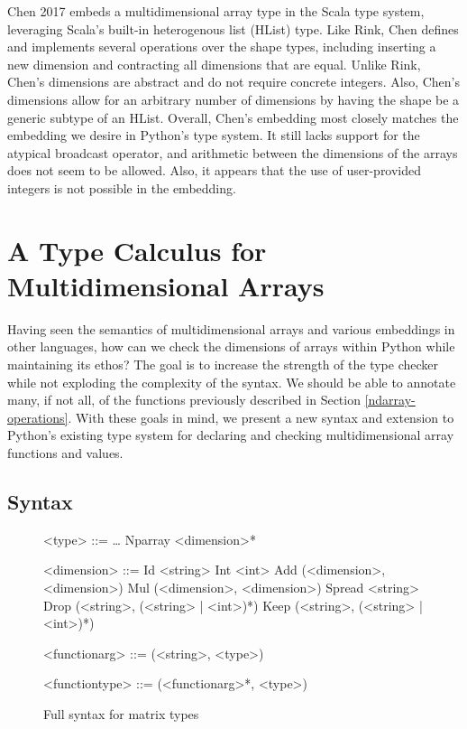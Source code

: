 \documentclass{report}
\begin{document}
Chen 2017 embeds a multidimensional array type in the Scala type system, leveraging Scala's built-in heterogenous list (HList) type. Like Rink, Chen defines and implements several operations over the shape types, including inserting a new dimension and contracting all dimensions that are equal. Unlike Rink, Chen's dimensions are abstract and do not require concrete integers. Also, Chen's dimensions allow for an arbitrary number of dimensions by having the shape be a generic subtype of an HList. Overall, Chen's embedding most closely matches the embedding we desire in Python's type system. It still lacks support for the atypical broadcast operator, and arithmetic between the dimensions of the arrays does not seem to be allowed. Also, it appears that the use of user-provided integers is not possible in the embedding.

\chapter{A Type Calculus for Multidimensional Arrays}

Having seen the semantics of multidimensional arrays and various embeddings in other languages, how can we check the dimensions of arrays within Python while maintaining its ethos? The goal is to increase the strength of the type checker while not exploding the complexity of the syntax. We should be able to annotate many, if not all, of the functions previously described in Section \ref{ndarray-operations}. With these goals in mind, we present a new syntax and extension to Python's existing type system for declaring and checking multidimensional array functions and values.

\section{Syntax}

\begin{figure}
    \centering
    \begin{grammar}
        <type> ::= \ldots
        \alt Nparray <dimension>*

        <dimension> ::= Id <string>
        \alt Int <int>
        \alt Add (<dimension>, <dimension>)
        \alt Mul (<dimension>, <dimension>)
        \alt Spread <string>
        \alt Drop (<string>, (<string> | <int>)*)
        \alt Keep (<string>, (<string> | <int>)*)

        <functionarg> ::= (<string>, <type>)

        <functiontype> ::= (<functionarg>*, <type>)

    \end{grammar}
    \caption{Full syntax for matrix types}
    \label{syntax}
\end{figure}
\end{document}
